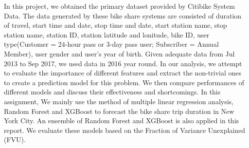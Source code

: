   \par In this project, we obtained the primary dataset provided by Citibike System Data. The data generated by these bike share systems are consisted of duration of travel, start time and date, stop time and date, start station name, stop station name, station ID, station latitude and lonitude, bike ID, user type(Customer = 24-hour pass or 3-day pass user; Subscriber = Annual Member), user gender and user's year of birth. Given adequate data from Jul 2013 to Sep 2017, we used data in 2016 year round. In our analysis, we attempt to evaluate the importance of different features and extract the non-trivial ones to create a prediction model for this problem. We then compare performances of different models and discuss their effectiveness and shortcomings. In this assignment, We mainly use the method of multiple linear regression analysis, Random Forest and XGBoost to forecast the bike share trip duration in New York City. An ensemble of Random Forest and XGBoost is also applied in this report. We evaluate these models based on the Fraction of Variance Unexplained (FVU). 

